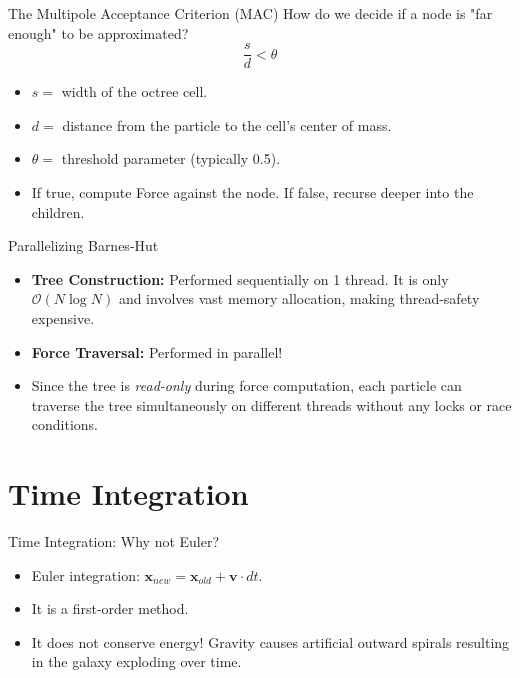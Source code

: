 \documentclass[aspectratio=169]{beamer}
\begin{document}
\begin{frame}{The Multipole Acceptance Criterion (MAC)}
    How do we decide if a node is "far enough" to be approximated?
    \begin{equation*}
        \frac{s}{d} < \theta
    \end{equation*}
    \begin{itemize}
        \item $s =$ width of the octree cell.
        \item $d =$ distance from the particle to the cell's center of mass.
        \item $\theta =$ threshold parameter (typically 0.5).
        \item If true, compute Force against the node. If false, recurse deeper into the children.
    \end{itemize}
\end{frame}

\begin{frame}{Parallelizing Barnes-Hut}
    \begin{itemize}
        \item \textbf{Tree Construction:} Performed sequentially on 1 thread. It is only $\mathcal{O}(N \log N)$ and involves vast memory allocation, making thread-safety expensive.
        \item \textbf{Force Traversal:} Performed in parallel! 
        \item Since the tree is \textit{read-only} during force computation, each particle can traverse the tree simultaneously on different threads without any locks or race conditions.
    \end{itemize}
\end{frame}

\section{Time Integration}
\begin{frame}{Time Integration: Why not Euler?}
    \begin{itemize}
        \item Euler integration: $\mathbf{x}_{new} = \mathbf{x}_{old} + \mathbf{v} \cdot dt$.
        \item It is a first-order method.
        \item It does not conserve energy! Gravity causes artificial outward spirals resulting in the galaxy exploding over time.
    \end{itemize}
\end{frame}
\end{document}
